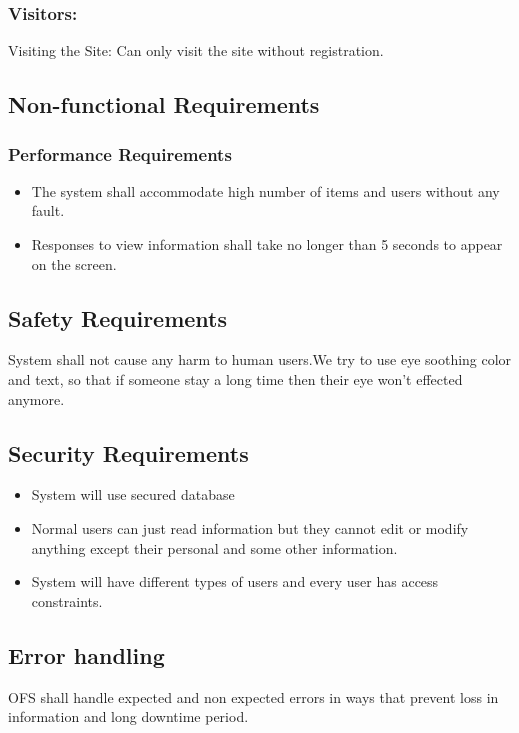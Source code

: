 \documentclass{article}
\begin{document}
\subsubsection{Visitors:} Visiting the Site: Can only visit the site without registration.

	
	
\subsection{Non-functional Requirements}
\subsubsection{Performance Requirements}
\begin{itemize}
\item The system shall accommodate high number of items and users without any fault.
\item Responses to view information shall take no longer than 5 seconds to appear on the screen.
\end{itemize}
\subsection{Safety Requirements} System shall not cause any harm to human users.We try to use eye soothing color and text, so that if someone stay a long time then their eye won't effected anymore.
\subsection{Security Requirements}
\begin{itemize}
\item System will use secured database
\item Normal users can just read information but they cannot edit or modify anything except their personal and some other information.
\item System will have different types of users and every user has access constraints.
\end{itemize}
\subsection{Error handling}
OFS shall handle expected and non expected errors in ways that prevent loss in information and long downtime period.
\end{document}
